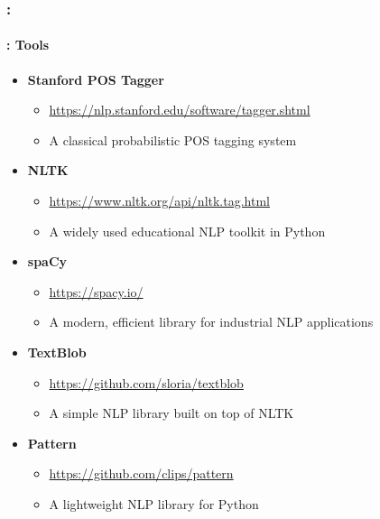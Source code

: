 \documentclass[xcolor=table]{beamer}
\begin{document}
\begin{frame}
	\frametitle{\insertshortsubtitle: \insertsection}
	\framesubtitle{\insertsubsection: Tools}


	\begin{itemize}
		\item \textbf{Stanford POS Tagger}
		\begin{itemize}
			\item \url{https://nlp.stanford.edu/software/tagger.shtml}
			\item A classical probabilistic POS tagging system
		\end{itemize}
		
		\item \textbf{NLTK}
		\begin{itemize}
			\item \url{https://www.nltk.org/api/nltk.tag.html}
			\item A widely used educational NLP toolkit in Python
		\end{itemize}
		
		\item \textbf{spaCy}
		\begin{itemize}
			\item \url{https://spacy.io/}
			\item A modern, efficient library for industrial NLP applications
		\end{itemize}
		
		\item \textbf{TextBlob}
		\begin{itemize}
			\item \url{https://github.com/sloria/textblob}
			\item A simple NLP library built on top of NLTK
		\end{itemize}
		
		\item \textbf{Pattern}
		\begin{itemize}
			\item \url{https://github.com/clips/pattern}
			\item A lightweight NLP library for Python
		\end{itemize}
		
	\end{itemize}

\end{frame}
\end{document}
